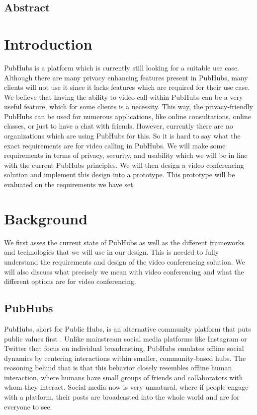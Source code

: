 \documentclass{report}
\begin{document}
\tableofcontents

\newpage
\section*{Abstract}


\chapter{Introduction}
PubHubs is a platform which is currently still looking for a suitable use case. Although there are many privacy enhancing features present in PubHubs, many clients will not use it since it lacks features which are required for their use case. We believe that having the ability to video call within PubHubs can be a very useful feature, which for some clients is a necessity.
This way, the privacy-friendly PubHubs can be used for numerous applications, like online consultations, online
classes, or just to have a chat with friends. However, currently there are no organizations which are using PubHubs for this. So it is hard to say what the exact requirements are
for video calling in PubHubs. We will make some requirements in terms of privacy, security, and usability which we
will be in line with the current PubHubs principles. We will then design a video conferencing solution and implement
this design into a prototype. This prototype will be evaluated on the requirements we have set.


\chapter{Background}
We first asses the current state of PubHubs as well as the different frameworks and technologies that we will use in
our design. This is needed to fully understand the requirements and design of the video conferencing solution. We
will also discuss what precisely we mean with video conferencing and what the different options are for video
conferencing.

\section{PubHubs}
PubHubs, short for Public Hubs, is an alternative community platform that puts public values first
\cite{jacobs_pubhubs_2023}. Unlike mainstream social media platforms like Instagram or Twitter that focus on
individual broadcasting, PubHubs emulates offline social dynamics by centering interactions within smaller,
community-based hubs. The reasoning
behind that is that this behavior closely resembles offline human interaction, where humans have small groups of
friends and collaborators with whom they interact. Social media now is very unnatural, where if people engage with a
platform, their posts are broadcasted into the whole world and are for everyone to see.
\end{document}
